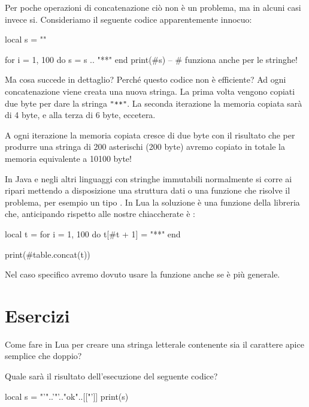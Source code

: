 Per poche operazioni di concatenazione ciò non è un problema, ma in alcuni casi
invece si. Consideriamo il seguente codice apparentemente innocuo:
\begin{lines}
local s = ""

for i = 1, 100 do
    s = s .. "**"
end
print(#s) -- # funziona anche per le stringhe!
\end{lines}

Ma cosa succede in dettaglio? Perché questo codice non è efficiente?
Ad ogni concatenazione viene creata una nuova stringa. La prima volta vengono
copiati due byte per dare la stringa \verb|"**"|. La seconda iterazione la
memoria copiata sarà di 4 byte, e alla terza di 6 byte, eccetera.

A ogni iterazione la memoria copiata cresce di due byte con il risultato che per
produrre una stringa di 200 asterischi (200 byte) avremo copiato in totale la
memoria equivalente a 10100 byte!

In Java e negli altri linguaggi con stringhe immutabili normalmente si corre ai
ripari mettendo a disposizione una struttura dati o una funzione che risolve il
problema, per esempio un tipo . In Lua la soluzione è una
funzione della libreria  che, anticipando rispetto alle nostre
chiaccherate è :
\begin{lines}
local t = {}
for i = 1, 100 do
    t[#t + 1] = "**"
end

print(#table.concat(t))
\end{lines}

Nel caso specifico avremo dovuto usare la funzione  anche se
 è più generale.


\section{Esercizi}

\begin{Exercise}[label=string-01]
Come fare in Lua per creare una stringa letterale contenente sia il
carattere apice semplice che doppio?
\end{Exercise}

\begin{Exercise}[label=string-02]
Quale sarà il risultato dell'esecuzione del seguente codice?
\begin{lines}
local s = "'"..'"'.."ok"..[["']]
print(s)
\end{lines}
\end{Exercise}

